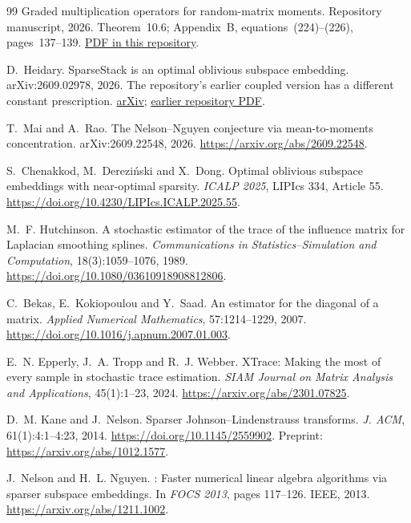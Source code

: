 \documentclass[11pt,a4paper]{article}
\theoremstyle{definition}
\theoremstyle{remark}
\newcommand{\1}{\mathbf 1}
\begin{document}
\begin{thebibliography}{99}
\newblock Graded multiplication operators for random-matrix moments.
\newblock Repository manuscript, 2026. Theorem~10.6; Appendix~B,
  equations~(224)--(226), pages~137--139.
\newblock \href{https://github.com/DiarHaidary/Results/blob/main/Graded\%20Multiplication\%20Operators\%20for\%20Random-Matrix\%20Moments.pdf}{PDF in this repository}.

D.~Heidary.
\newblock SparseStack is an optimal oblivious subspace embedding.
\newblock arXiv:2609.02978, 2026. The repository's earlier coupled
  version has a different constant prescription.
\newblock \href{https://arxiv.org/abs/2609.02978}{arXiv};
  \href{https://github.com/DiarHaidary/Results/blob/main/SparseStack.pdf}{earlier repository PDF}.

T.~Mai and A.~Rao.
\newblock The Nelson--Nguyen conjecture via mean-to-moments concentration.
\newblock arXiv:2609.22548, 2026.
\newblock \url{https://arxiv.org/abs/2609.22548}.

S.~Chenakkod, M.~Derezi\'nski and X.~Dong.
\newblock Optimal oblivious subspace embeddings with near-optimal sparsity.
\newblock \emph{ICALP 2025}, LIPIcs 334, Article 55.
\newblock \url{https://doi.org/10.4230/LIPIcs.ICALP.2025.55}.

M.~F. Hutchinson.
\newblock A stochastic estimator of the trace of the influence matrix
  for Laplacian smoothing splines.
\newblock \emph{Communications in Statistics--Simulation and
  Computation}, 18(3):1059--1076, 1989.
\newblock \url{https://doi.org/10.1080/03610918908812806}.

C.~Bekas, E.~Kokiopoulou and Y.~Saad.
\newblock An estimator for the diagonal of a matrix.
\newblock \emph{Applied Numerical Mathematics}, 57:1214--1229, 2007.
\newblock \url{https://doi.org/10.1016/j.apnum.2007.01.003}.

E.~N. Epperly, J.~A. Tropp and R.~J. Webber.
\newblock XTrace: Making the most of every sample in stochastic trace estimation.
\newblock \emph{SIAM Journal on Matrix Analysis and Applications},
 45(1):1--23, 2024.
\newblock \url{https://arxiv.org/abs/2301.07825}.

D.~M. Kane and J.~Nelson.
\newblock Sparser {J}ohnson--{L}indenstrauss transforms.
\newblock \emph{J. ACM}, 61(1):4:1--4:23, 2014.
\newblock \url{https://doi.org/10.1145/2559902}.
\newblock Preprint: \url{https://arxiv.org/abs/1012.1577}.

J.~Nelson and H.~L. Nguyen.
: Faster numerical linear algebra algorithms via sparser
  subspace embeddings.
\newblock In \emph{FOCS 2013}, pages 117--126. IEEE, 2013.
\newblock \url{https://arxiv.org/abs/1211.1002}.

\end{thebibliography}
\end{document}
